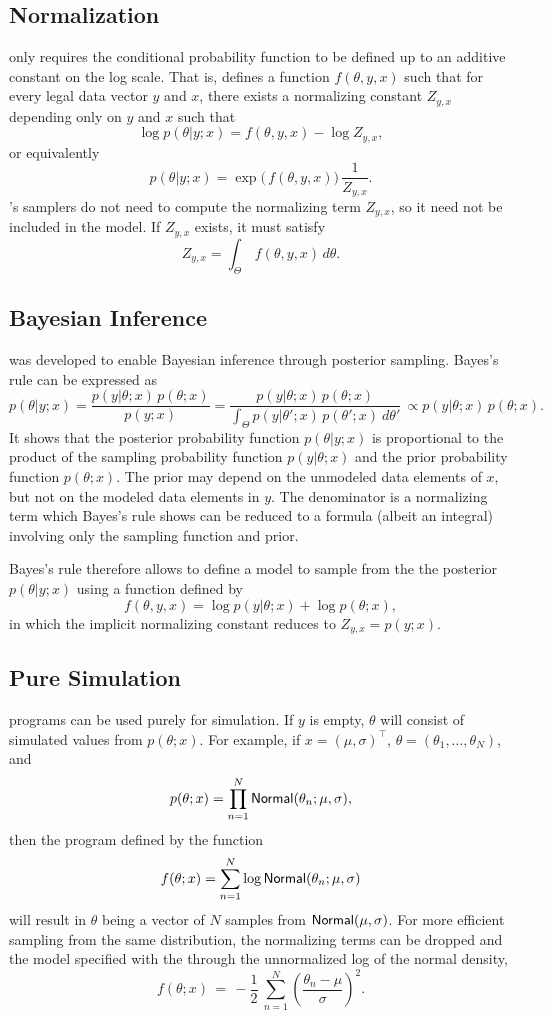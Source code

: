 \subsection{Normalization}

\Stan only requires the conditional probability function to be defined
up to an additive constant on the log scale.  That is, \Stan defines a
function $f(\theta,y,x)$ such that for every legal data vector $y$ and
$x$, there exists a normalizing constant $Z_{y,x}$ depending only on $y$
and $x$ such that
%
\[
\log p(\theta|y;x) = f(\theta,y,x) - \log Z_{y,x},
\]
%
or equivalently
%
\[
p(\theta|y;x) = \exp \! \big( \, f(\theta,y,x) \big)  \, \frac{1}{Z_{y,x}}.
\]
%
\Stan's samplers do not need to compute the normalizing term
$Z_{y,x}$, so it need not be included in the model.  If $Z_{y,x}$
exists, it must satisfy
\[
Z_{y,x} = \int_{\Theta} \, f(\theta,y,x) \, d\theta.
\]

\subsection{Bayesian Inference}

\Stan was developed to enable Bayesian inference through posterior
sampling.  Bayes's rule can be expressed as
%
\[
p(\theta|y;x) 
= \frac{p(y|\theta;x) \, p(\theta;x)}{p(y;x)}
= \frac{p(y|\theta;x) \, p(\theta;x)}
       {\int_{\Theta} p(y|\theta';x) \,  p(\theta';x) \ d\theta'} \, 
\propto p(y|\theta;x) \, p(\theta;x).
\]
%
It shows that the posterior probability function $p(\theta|y;x)$ is
proportional to the product of the sampling probability function
$p(y|\theta;x)$ and the prior probability function $p(\theta;x)$.  The
prior may depend on the unmodeled data elements of $x$, but not on the
modeled data elements in $y$.  The denominator is a normalizing term
which Bayes's rule shows can be reduced to a formula (albeit an
integral) involving only the sampling function and prior.

Bayes's rule therefore allows \Stan to define a model to sample from
the the posterior $p(\theta|y;x)$ using a function defined by
\[
f(\theta,y,x) = \log p(y|\theta;x) + \log p(\theta;x),
\]
in which the implicit normalizing constant reduces to $Z_{y,x} =
p(y;x)$.


\subsection{Pure Simulation}

\Stan programs can be used purely for simulation.  If $y$ is empty,
$\theta$ will consist of simulated values from $p(\theta;x)$.  For
example, if $x = (\mu,\sigma)^{\top}$, $\theta =
(\theta_1,\ldots,\theta_N)$, and 
\[
p(\theta;x) =  \prod_{n=1}^N \mbox{\sf Normal}(\theta_n;\mu,\sigma),
\]
then the \Stan program defined by the function
\[
f(\theta;x) = \sum_{n=1}^N \log \mbox{\sf Normal}(\theta_n;\mu,\sigma)
\]
will result in $\theta$ being a vector of $N$ samples from
$\mbox{\sf Normal}(\mu,\sigma)$.  For more efficient sampling from the
same distribution, the normalizing terms can be dropped and the model
specified with the through the unnormalized log of the normal density,
\[
f(\theta;x) \, = \, -\frac{1}{2} \ \sum_{n=1}^N \left( \frac{\theta_n -
    \mu}{\sigma}\right)^2.
\]



